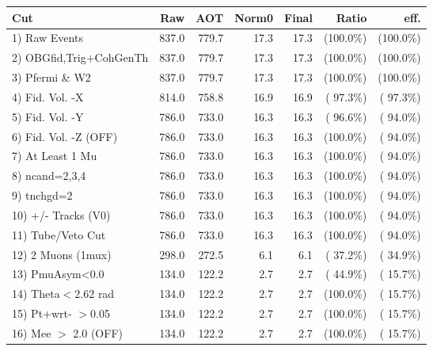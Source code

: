  \begin{table}[h!]\centering
 \begin{tabular}{||l||r|r|r|r|r|r||}
 \hline
 \hline
 Cut & Raw & AOT & Norm0 & Final & Ratio & eff.       \\
 \hline
  1) Raw Events           &        837.0 &        779.7 &         17.3 &         17.3 & (100.0\%) & (100.0\%) \\
  2) OBGfid,Trig+CohGenTh &        837.0 &        779.7 &         17.3 &         17.3 & (100.0\%) & (100.0\%) \\
  3) Pfermi \& W2         &        837.0 &        779.7 &         17.3 &         17.3 & (100.0\%) & (100.0\%) \\
  4) Fid. Vol. -X         &        814.0 &        758.8 &         16.9 &         16.9 & ( 97.3\%) & ( 97.3\%) \\
  5) Fid. Vol. -Y         &        786.0 &        733.0 &         16.3 &         16.3 & ( 96.6\%) & ( 94.0\%) \\
  6) Fid. Vol. -Z (OFF)   &        786.0 &        733.0 &         16.3 &         16.3 & (100.0\%) & ( 94.0\%) \\
  7) At Least 1 Mu        &        786.0 &        733.0 &         16.3 &         16.3 & (100.0\%) & ( 94.0\%) \\
  8) ncand=2,3,4          &        786.0 &        733.0 &         16.3 &         16.3 & (100.0\%) & ( 94.0\%) \\
  9) tnchgd=2             &        786.0 &        733.0 &         16.3 &         16.3 & (100.0\%) & ( 94.0\%) \\
 10) +/- Tracks (V0)      &        786.0 &        733.0 &         16.3 &         16.3 & (100.0\%) & ( 94.0\%) \\
 11) Tube/Veto Cut        &        786.0 &        733.0 &         16.3 &         16.3 & (100.0\%) & ( 94.0\%) \\
 12) 2 Muons (1mux)       &        298.0 &        272.5 &          6.1 &          6.1 & ( 37.2\%) & ( 34.9\%) \\
 13) PmuAsym<0.0          &        134.0 &        122.2 &          2.7 &          2.7 & ( 44.9\%) & ( 15.7\%) \\
 14) Theta$<$2.62 rad     &        134.0 &        122.2 &          2.7 &          2.7 & (100.0\%) & ( 15.7\%) \\
 15) Pt+wrt- $>$0.05      &        134.0 &        122.2 &          2.7 &          2.7 & (100.0\%) & ( 15.7\%) \\
 16) Mee $>$ 2.0  (OFF)   &        134.0 &        122.2 &          2.7 &          2.7 & (100.0\%) & ( 15.7\%) \\

\end{tabular}
\end{table}
